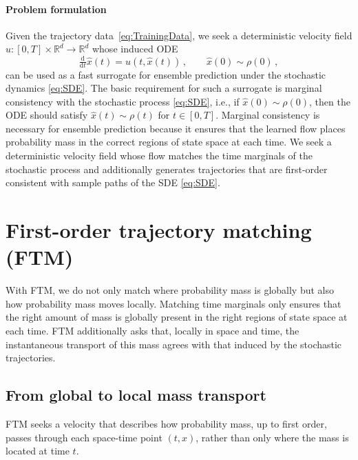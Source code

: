 \documentclass[oneside,11pt]{article}
\theoremstyle{remark}
\begin{document}
\paragraph{Problem formulation}
Given the trajectory data~\eqref{eq:TrainingData}, we seek a deterministic velocity field $u: [0, T] \times \mathbb{R}^d \to \mathbb{R}^d$ whose induced ODE 
\begin{equation}\label{eq:ODEFlow}
\tfrac{\mathrm d}{\mathrm dt}\hat{x}(t) = u(t, \hat{x}(t))\,,\qquad \hat{x}(0) \sim \rho(0)\,,
\end{equation}
can be used as a fast surrogate for ensemble prediction under the stochastic dynamics \eqref{eq:SDE}. 
The basic requirement for such a surrogate is marginal consistency with the stochastic process \eqref{eq:SDE}, i.e., if $\hat{x}(0) \sim \rho(0)$, then the ODE should satisfy $\hat{x}(t) \sim \rho(t)$ for $t \in [0, T]$. 
Marginal consistency is necessary for ensemble prediction because it ensures that the learned flow places probability mass in the correct regions of state space at each time. 
We seek a deterministic velocity field whose  flow matches the time marginals of the stochastic process and additionally generates trajectories that are first-order consistent with sample paths of the SDE \eqref{eq:SDE}.


\section{First-order trajectory matching (FTM)}

With FTM, we do not only match where probability mass is globally but also how probability mass moves locally. Matching time marginals only ensures that the right amount of mass is globally present in the right regions of state space at each time. FTM additionally asks that, locally in space and time, the instantaneous transport of this mass agrees with that induced by  the stochastic trajectories.

\subsection{From global to local mass transport} 
\label{sec:motivate-current}


FTM seeks a velocity that describes how probability mass,  up to first order, passes through each space-time point $(t,x)$, rather than only where the mass is located at time $t$.
\end{document}
